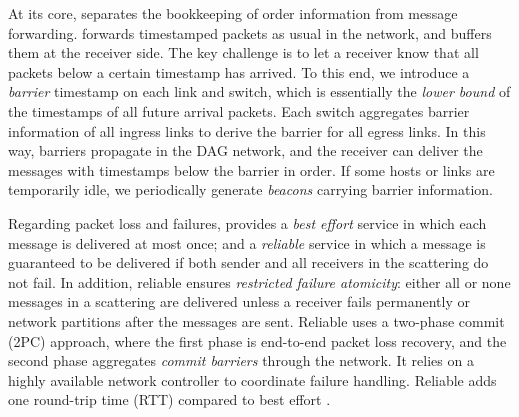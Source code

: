 At its core, \sys separates the bookkeeping of order information from message forwarding.
\sys forwards timestamped packets as usual in the network, and buffers them at the receiver side.
The key challenge is to let a receiver know that all packets below a certain timestamp has arrived.
To this end, we introduce a \emph{barrier} timestamp on each link and switch, which is essentially the \emph{lower bound} of the timestamps of all future arrival packets.
Each switch aggregates barrier information of all ingress links to derive the barrier for all egress links.
In this way, barriers propagate in the DAG network, and the receiver can deliver the messages with timestamps below the barrier in order.
If some hosts or links are temporarily idle, we periodically generate \emph{beacons} carrying barrier information.

Regarding packet loss and failures, \sys{} provides a \emph{best effort} service in which each message is delivered at most once; and a \emph{reliable} service in which a message is guaranteed to be delivered if both sender and all receivers in the scattering do not fail.
In addition, reliable \sys{} ensures \emph{restricted failure atomicity}: either all or none messages in a scattering are delivered unless a receiver fails permanently or network partitions after the messages are sent.
Reliable \sys{} uses a two-phase commit (2PC) approach, where the first phase is end-to-end packet loss recovery, and the second phase aggregates \emph{commit barriers} through the network.
It relies on a highly available network controller to coordinate failure handling.
Reliable \sys{} adds one round-trip time (RTT) compared to best effort \sys{}.

